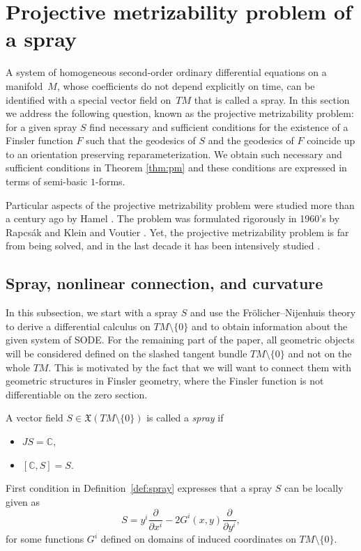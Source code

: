 \documentclass[11pt]{article}
\numberwithin{equation}{section}
\begin{document}
\section{Projective metrizability problem of a spray}
\label{sec:pms}

A system of homogeneous second-order ordinary dif\/ferential equations
on a manifold~$M$, whose coef\/f\/icients do not depend explicitly on time, can be identif\/ied
with a special vector f\/ield on~$TM$ that is called a spray. In
this section we address the following question, known as the
projective metrizability problem: for a given spray $S$ f\/ind necessary
and suf\/f\/icient conditions for the existence of a Finsler function $F$
such that the geodesics of $S$ and the geodesics of $F$ coincide up to
an orientation preserving reparameterization. We obtain such necessary and
suf\/f\/icient conditions in Theorem \ref{thm:pm} and these conditions are expressed
in terms of semi-basic $1$-forms.

Particular aspects of the projective metrizability problem were studied more than a century ago by Hamel
\cite{hamel03}. The problem was formulated rigorously in 1960's by Rapcs\'ak
\cite{rapcsak62} and Klein and Voutier \cite{klein68}. Yet, the projective
metrizability problem is far from being solved, and in the last decade
it has been intensively studied \cite{paiva05, bucataru09,
  crampin07b, crampin08,  shen01, szilasi07,  szilasi02, yang11}.


\subsection{Spray, nonlinear connection, and curvature}
\label{subsec:sn}

In this subsection, we start with a spray $S$ and use the Fr\"olicher--Nijenhuis theory
to derive a dif\/ferential calculus on $TM\setminus\{0\}$ \cite{grifone72} and to
obtain information about the given system of SODE. For the remaining
part of the paper, all geometric objects will be considered def\/ined on
the slashed tangent bundle $TM\setminus\{0\}$ and not on the whole
$TM$. This is motivated by the fact that we will want to connect them
with geometric structures in Finsler geometry, where the Finsler
function is not dif\/ferentiable on the zero section.

\begin{Definition} \label{def:spray} A vector f\/ield $S\in{\mathfrak X}(TM\setminus\{0\})$
is called a \emph{spray} if
\begin{itemize}\itemsep=0pt
\item[i)] $JS=\mathbb{C}$,
\item[ii)] $[\mathbb{C}, S]=S$. \end{itemize}
\end{Definition}
First condition in Def\/inition~\ref{def:spray} expresses that a
spray $S$ can be locally given as
\[
 S=y^i\frac{\partial}{\partial x^i} - 2G^i(x,y) \frac{\partial}{\partial   y^i},
  \]
   for some functions $G^i$ def\/ined on domains of induced
coordinates on $TM\setminus\{0\}$.
\end{document}
